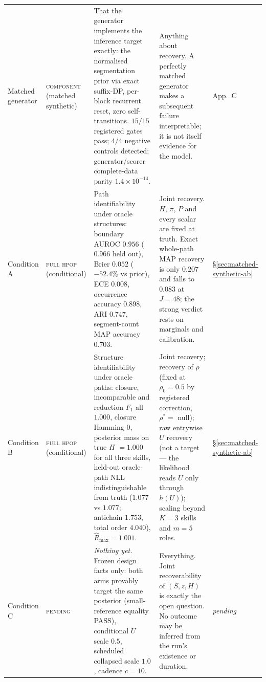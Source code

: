 \begin{table}[p]
\begin{tabularx}{\textwidth}{@{}l l X X l@{}}
Matched generator
& \textsc{component} \newline (matched synthetic)
& That the generator implements the inference target exactly: the normalised
  segmentation prior via exact suffix-DP, per-block recurrent reset, zero
  self-transitions. $15/15$ registered gates pass; $4/4$ negative controls
  detected; generator/scorer complete-data parity $1.4\times10^{-14}$.
& Anything about recovery. A perfectly matched generator makes a subsequent
  failure interpretable; it is not itself evidence for the model.
& App.~C \\

Condition A
& \textsc{full hpop} \newline (conditional)
& Path identifiability under oracle structures: boundary AUROC $0.956$
  ($0.966$ held out), Brier $0.052$ ($-52.4\%$ vs prior), ECE $0.008$,
  occurrence accuracy $0.898$, ARI $0.747$, segment-count MAP accuracy $0.703$.
& Joint recovery. $H$, $\pi$, $P$ and every scalar are fixed at truth. Exact
  whole-path MAP recovery is only $0.207$ and falls to $0.083$ at $J = 48$;
  the strong verdict rests on marginals and calibration.
& \S\ref{sec:matched-synthetic-ab} \\

Condition B
& \textsc{full hpop} \newline (conditional)
& Structure identifiability under oracle paths: closure, incomparable and
  reduction $F_1$ all $1.000$, closure Hamming $0$, posterior mass on true $H$
  $= 1.000$ for all three skills, held-out oracle-path NLL indistinguishable
  from truth ($1.077$ vs $1.077$; antichain $1.753$, total order $4.040$),
  $\widehat{R}_{\max} = 1.001$.
& Joint recovery; recovery of $\rho$ (fixed at $\rho_0 = 0.5$ by registered
  correction, $\rho^\ast = $ null); raw entrywise $U$ recovery (not a target ---
  the likelihood reads $U$ only through $h(U)$); scaling beyond $K = 3$ skills
  and $m = 5$ roles.
& \S\ref{sec:matched-synthetic-ab} \\

Condition C
& \textsc{pending}
& \emph{Nothing yet.} Frozen design facts only: both arms provably target the
  same posterior (small-reference equality PASS), conditional $U$ scale $0.5$,
  scheduled collapsed scale $1.0$, cadence $c = 10$.
& Everything. Joint recoverability of $(S, z, H)$ is exactly the open question.
  No outcome may be inferred from the run's existence or duration.
& \textit{pending} \\


\end{tabularx}
\end{table}
